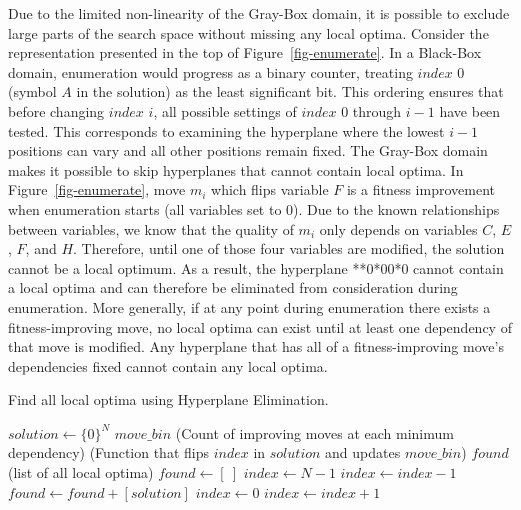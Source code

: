 \documentclass[runningheads,a4paper]{llncs}
\begin{document}
Due to the limited non-linearity of the Gray-Box domain, it is possible to exclude large
parts of the search space without missing any local optima.
Consider the representation presented in the top of Figure~\ref{fig-enumerate}. In a Black-Box
domain, enumeration would progress as a binary counter, treating $index$ 0 (symbol $A$ in the solution) as
the least significant bit. This ordering ensures that before changing $index$ $i$, all possible settings of $index$
0 through $i-1$ have been tested. This corresponds to examining the hyperplane where the lowest $i-1$ positions
can vary and all other positions remain fixed. The Gray-Box domain makes it possible to skip hyperplanes
that cannot contain local optima. In Figure~\ref{fig-enumerate}, move $m_i$ which flips variable $F$ is a fitness improvement
when enumeration starts (all variables set to 0). Due to the known relationships between variables,
we know that the quality of $m_i$ only depends on variables $C$, $E$, $F$, and $H$.
Therefore, until one of those four variables are modified, the solution cannot be a local optimum.
As a result, the hyperplane **0*00*0 cannot contain a local optima and can
therefore be eliminated from consideration during enumeration.
More generally, if at any point during enumeration
there exists a fitness-improving move, no local optima can exist until at least one
dependency of that move is modified. Any hyperplane that has all of a fitness-improving
move's dependencies fixed cannot contain any local optima.

\begin{algorithm}
  \caption{Find all local optima using Hyperplane Elimination.}
  \label{alg-enumerate}
  \begin{algorithmic}[1]
    \Require $solution \leftarrow \{0\}^N$
    \Require $move\_bin$ (Count of improving moves at each minimum dependency)
    \Require {} (Function that flips $index$ in $solution$ and updates $move\_bin$)
    \Ensure $found$ (list of all local optima)
    \State $found \leftarrow [~]$
    \State $index \leftarrow N-1$
      \label{alg-enumerate-bincheck}
        \State $index \leftarrow index-1$
      \EndWhile
        \State $found \leftarrow found + [solution]$
        \State $index \leftarrow 0$
      \EndIf
      \label{alg-enumerate-counter}
        \State {}
        \State $index \leftarrow index + 1$
      \EndWhile
        \State {}\label{alg-enumerate-insert}
      \EndIf
    \EndWhile
  \end{algorithmic}
\end{algorithm}
\end{document}
